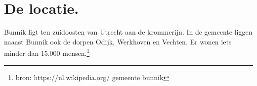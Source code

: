 \section{De locatie.}
Bunnik ligt ten zuidoosten van Utrecht aan de krommerijn. 
In de gemeente liggen naaast Bunnik ook de dorpen Odijk, Werkhoven en Vechten. 
Er wonen iets minder dan 15.000 mensen.\footnote{bron: https://nl.wikipedia.org/ gemeente bunnik}

